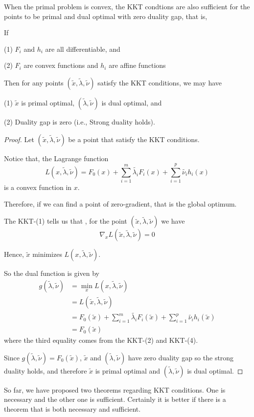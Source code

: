 \begin{theorem}\label{kktsufficient}
	When the primal problem is convex, the KKT condtions are also sufficient for the points to be primal and dual optimal with zero duality gap, that is, 
	
	If
	
		(1) $F_i$ and $h_i$ are all differentiable, and
		
		(2) $F_i$ are convex functions and $h_i$ are affine functions
	
	Then for any points $(\tilde{x},\tilde{\lambda},\tilde{\nu})$ satisfy the KKT conditions, we may have
		
	 	(1)	$\tilde{x}$ is primal optimal, $(\tilde{\lambda},\tilde{\nu})$ is  dual optimal, and
	 	
	 	(2) Duality gap is zero (i.e., Strong duality holds).
	 	

\end{theorem}

\begin{proof}
	Let $(\tilde{x},\tilde{\lambda},\tilde{\nu})$ be a point that satisfy the KKT conditions. 
	
	Notice that, the Lagrange function
	$$L(x,\tilde{\lambda}, \tilde{\nu}) = F_0(x) + \sum^m_{i=1}\tilde{\lambda_i}F_i(x) + \sum^p_{i=1}\tilde{\nu_i}h_i(x)$$
	is a convex function in $x$. 
	
	Therefore, if we can find a point of zero-gradient, that is the global optimum.
	
	The KKT-(1) tells us that , for the point $(\tilde{x},\tilde{\lambda},\tilde{\nu})$ we have
	$$\nabla_xL(\tilde{x},\tilde{\lambda},\tilde{\nu}) = 0$$

	Hence, $\tilde{x}$ minimizes $L(x,\tilde{\lambda},\tilde{\nu})$. 
	
	So the dual function is given by	
	\begin{align*}
	g(\tilde{\lambda}, \tilde{\nu}) 
	&= \min_xL(x,\tilde{\lambda},\tilde{\nu})\\
	&= L(\tilde{x},\tilde{\lambda},\tilde{\nu})\\
	&= F_0(\tilde{x}) + \sum^m_{i=1}\tilde{\lambda_i}F_i(\tilde{x}) + \sum^p_{i=1}\tilde{\nu_i}h_i(\tilde{x})\\
	&= F_0(\tilde{x})
	\end{align*}
	where the third equality comes from the KKT-(2) and KKT-(4).
	
	Since $g(\tilde{\lambda},\tilde{\nu}) = F_0(\tilde{x})$, $\tilde{x}$ and $(\tilde{\lambda},\tilde{\nu})$ have zero duality gap so the strong duality holds, and therefore $\tilde{x}$ is primal optimal and $(\tilde{\lambda},\tilde{\nu})$ is dual optimal.
\end{proof}
So far, we have proposed two theorems regarding KKT conditions. One is necessary and the other one is sufficient. Certainly it is better if there is a theorem that is both necessary and sufficient.

